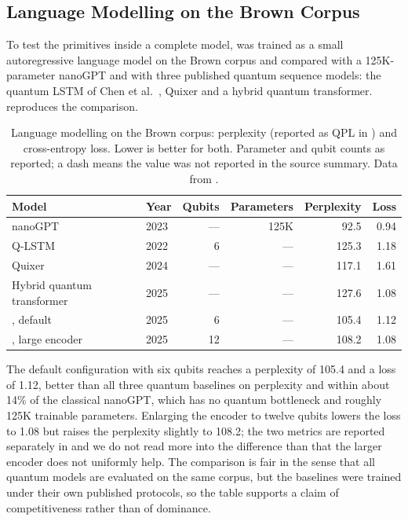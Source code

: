 \subsection{Language Modelling on the Brown Corpus}\label{sec:qml:vqt:lm}

To test the primitives inside a complete model, \vqt{} was trained as a small autoregressive language model on the Brown corpus \cite{francis1979brown} and compared with a 125K-parameter nanoGPT \cite{karpathy2023nanogpt} and with three published quantum sequence models: the quantum LSTM of Chen et al.~\cite{chen2022qlstm}, Quixer \cite{khatri2024quixer} and a hybrid quantum transformer.  reproduces the comparison.

\begin{table}[htbp]
\caption{Language modelling on the Brown corpus: perplexity (reported as QPL in \cite{guo2025vqt}) and cross-entropy loss. Lower is better for both. Parameter and qubit counts as reported; a dash means the value was not reported in the source summary. Data from \cite{guo2025vqt}.}\label{tab:qml:vqt-lm}
\centering
\small
\begin{tabular}{@{}llrrrr@{}}
\toprule
Model & Year & Qubits & Parameters & Perplexity & Loss \\
\midrule
nanoGPT \cite{karpathy2023nanogpt} & 2023 & --- & 125K & 92.5 & 0.94 \\
Q-LSTM \cite{chen2022qlstm} & 2022 & 6 & --- & 125.3 & 1.18 \\
Quixer \cite{khatri2024quixer} & 2024 & --- & --- & 117.1 & 1.61 \\
Hybrid quantum transformer & 2025 & --- & --- & 127.6 & 1.08 \\
\vqt{}, default & 2025 & 6 & --- & 105.4 & 1.12 \\
\vqt{}, large encoder & 2025 & 12 & --- & 108.2 & 1.08 \\
\bottomrule
\end{tabular}
\end{table}

The default \vqt{} configuration with six qubits reaches a perplexity of 105.4 and a loss of 1.12, better than all three quantum baselines on perplexity and within about 14\% of the classical nanoGPT, which has no quantum bottleneck and roughly 125K trainable parameters. Enlarging the encoder to twelve qubits lowers the loss to 1.08 but raises the perplexity slightly to 108.2; the two metrics are reported separately in \cite{guo2025vqt} and we do not read more into the difference than that the larger encoder does not uniformly help. The comparison is fair in the sense that all quantum models are evaluated on the same corpus, but the baselines were trained under their own published protocols, so the table supports a claim of competitiveness rather than of dominance.

